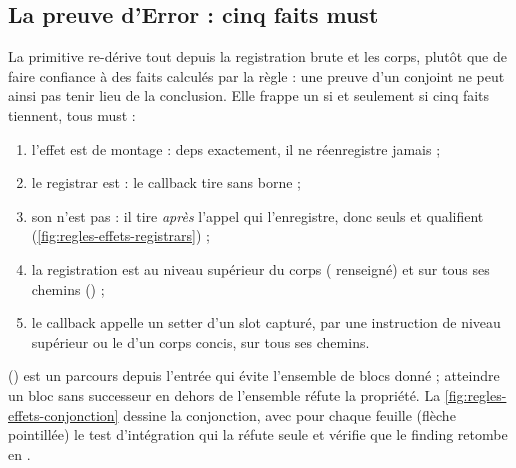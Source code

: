 \subsection{La preuve d'Error : cinq faits must}


La primitive re-dérive tout depuis la registration brute et les corps, plutôt que de faire confiance à des faits calculés par la règle : une preuve d'un conjoint ne peut ainsi pas tenir lieu de la conclusion. Elle frappe un  si et seulement si cinq faits tiennent, tous must :
\begin{enumerate}
  \item l'effet est de montage : deps \code{[]} exactement, il ne réenregistre jamais ;
  \item le registrar est  : le callback tire sans borne ;
  \item son  n'est pas  : il tire \emph{après} l'appel qui l'enregistre, donc seuls  et  qualifient (\cref{fig:regles-effets-registrars}) ;
  \item la registration est au niveau supérieur du corps ( renseigné) et sur tous ses chemins () ;
  \item le callback appelle un setter d'un slot capturé, par une instruction de niveau supérieur ou le  d'un corps concis, sur tous ses chemins.
\end{enumerate}

 () est un parcours depuis l'entrée qui évite l'ensemble de blocs donné ; atteindre un bloc sans successeur en dehors de l'ensemble réfute la propriété. La \cref{fig:regles-effets-conjonction} dessine la conjonction, avec pour chaque feuille (flèche pointillée) le test d'intégration qui la réfute seule et vérifie que le finding retombe en \Warning.

